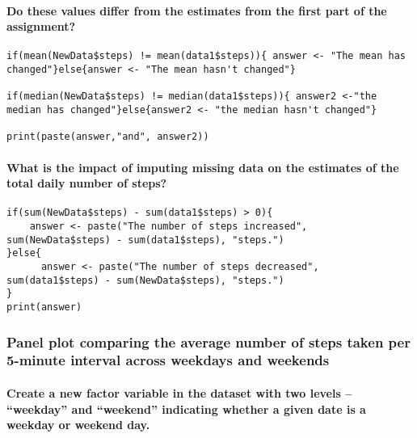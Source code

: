 \documentclass[
]{article}
\begin{document}
\hypertarget{do-these-values-differ-from-the-estimates-from-the-first-part-of-the-assignment}{%
\paragraph{Do these values differ from the estimates from the first part
of the
assignment?}\label{do-these-values-differ-from-the-estimates-from-the-first-part-of-the-assignment}}

\begin{verbatim}
if(mean(NewData$steps) != mean(data1$steps)){ answer <- "The mean has changed"}else{answer <- "The mean hasn't changed"}

if(median(NewData$steps) != median(data1$steps)){ answer2 <-"the median has changed"}else{answer2 <- "the median hasn't changed"}

print(paste(answer,"and", answer2))
\end{verbatim}

\hypertarget{what-is-the-impact-of-imputing-missing-data-on-the-estimates-of-the-total-daily-number-of-steps}{%
\paragraph{What is the impact of imputing missing data on the estimates
of the total daily number of
steps?}\label{what-is-the-impact-of-imputing-missing-data-on-the-estimates-of-the-total-daily-number-of-steps}}

\begin{verbatim}
if(sum(NewData$steps) - sum(data1$steps) > 0){ 
    answer <- paste("The number of steps increased", sum(NewData$steps) - sum(data1$steps), "steps.")
}else{
      answer <- paste("The number of steps decreased", sum(data1$steps) - sum(NewData$steps), "steps.")
}
print(answer)
\end{verbatim}

\hypertarget{panel-plot-comparing-the-average-number-of-steps-taken-per-5-minute-interval-across-weekdays-and-weekends}{%
\subsubsection{Panel plot comparing the average number of steps taken
per 5-minute interval across weekdays and
weekends}\label{panel-plot-comparing-the-average-number-of-steps-taken-per-5-minute-interval-across-weekdays-and-weekends}}

\hypertarget{create-a-new-factor-variable-in-the-dataset-with-two-levels-weekday-and-weekend-indicating-whether-a-given-date-is-a-weekday-or-weekend-day.}{%
\paragraph{Create a new factor variable in the dataset with two levels
-- ``weekday'' and ``weekend'' indicating whether a given date is a
weekday or weekend
day.}\label{create-a-new-factor-variable-in-the-dataset-with-two-levels-weekday-and-weekend-indicating-whether-a-given-date-is-a-weekday-or-weekend-day.}}
\end{document}
